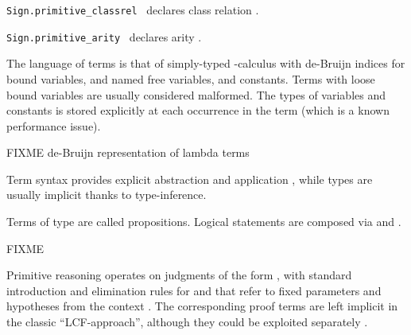 \begin{isabellebody}
\begin{isamarkuptext}
\begin{description}
  \item \verb|Sign.primitive_classrel|~ declares class relation .

  \item \verb|Sign.primitive_arity|~ declares
  arity .

  \end{description}%
\end{isamarkuptext}%
\isamarkuptrue%
%
\endisatagmlref
{\isafoldmlref}%
%
\isadelimmlref
%
\endisadelimmlref
%
\isamarkuptrue%
%
\begin{isamarkuptext}%

  The language of terms is that of simply-typed \isa{{\isasymlambda}}-calculus
  with de-Bruijn indices for bound variables, and named free
  variables, and constants.  Terms with loose bound variables are
  usually considered malformed.  The types of variables and constants
  is stored explicitly at each occurrence in the term (which is a
  known performance issue).

  FIXME de-Bruijn representation of lambda terms

  Term syntax provides explicit abstraction 
  and application , while types are usually implicit
  thanks to type-inference.

  Terms of type  are called
  propositions.  Logical statements are composed via  and .%
\end{isamarkuptext}%
\isamarkuptrue%
%
\begin{isamarkuptext}%
FIXME


%
\end{isamarkuptext}%
\isamarkuptrue%
%
\isamarkuptrue%
%
\begin{isamarkuptext}%
Primitive reasoning operates on judgments of the form \isa{{\isasymGamma}\ {\isasymturnstile}\ {\isasymphi}}, with standard introduction and elimination rules for \isa{{\isasymAnd}} and \isa{{\isasymLongrightarrow}} that refer to fixed parameters  and
  hypotheses  from the context \isa{{\isasymGamma}}.  The
  corresponding proof terms are left implicit in the classic
  ``LCF-approach'', although they could be exploited separately
  \cite{Berghofer-Nipkow:2000}.


\end{isamarkuptext}
\end{isabellebody}
